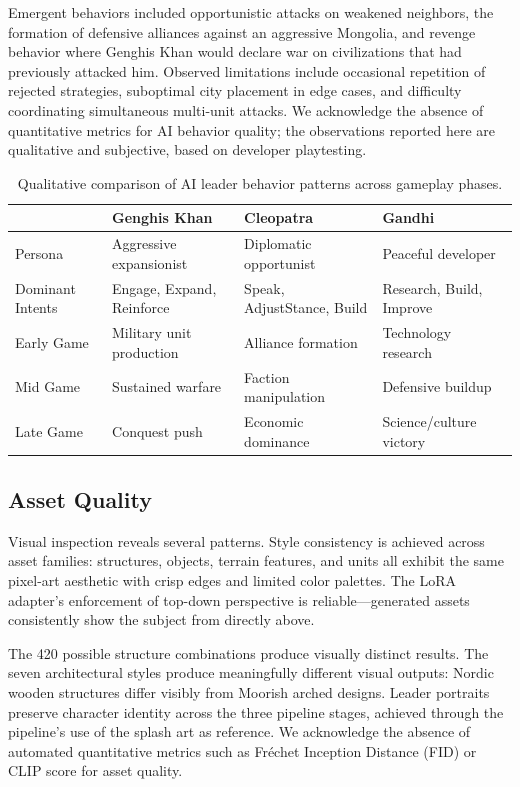\documentclass[conference]{IEEEtran}
\begin{document}
Emergent behaviors included opportunistic attacks on weakened neighbors,
the formation of defensive alliances against an aggressive Mongolia, and
revenge behavior where Genghis Khan would declare war on civilizations that
had previously attacked him. Observed limitations include occasional
repetition of rejected strategies, suboptimal city placement in edge cases,
and difficulty coordinating simultaneous multi-unit attacks. We acknowledge
the absence of quantitative metrics for AI behavior quality; the
observations reported here are qualitative and subjective, based on
developer playtesting.
\begin{table}[htb]
\centering
\caption{Qualitative comparison of AI leader behavior patterns across gameplay phases.}
\label{tab:ai-behavior}
\begin{tabular}{p{}p{}p{}p{}}
\toprule
& \textbf{Genghis Khan} & \textbf{Cleopatra} & \textbf{Gandhi} \\
\midrule
Persona & Aggressive expansionist & Diplomatic opportunist & Peaceful developer \\
Dominant Intents & Engage, Expand, Reinforce & Speak, AdjustStance, Build & Research, Build, Improve \\
Early Game & Military unit production & Alliance formation & Technology research \\
Mid Game & Sustained warfare & Faction manipulation & Defensive buildup \\
Late Game & Conquest push & Economic dominance & Science/culture victory \\
\bottomrule
\end{tabular}
\end{table}

\subsection{Asset Quality}

Visual inspection reveals several patterns. Style consistency is achieved
across asset families: structures, objects, terrain features, and units all
exhibit the same pixel-art aesthetic with crisp edges and limited color
palettes. The LoRA adapter's enforcement of top-down perspective is
reliable---generated assets consistently show the subject from directly
above.

The 420 possible structure combinations produce visually distinct results.
The seven architectural styles produce meaningfully different visual
outputs: Nordic wooden structures differ visibly from Moorish arched
designs. Leader portraits preserve character identity across the three
pipeline stages, achieved through the pipeline's use of the splash
art as reference. We acknowledge the absence of automated quantitative
metrics such as Fr\'{e}chet Inception Distance (FID) or CLIP score for
asset quality.
\end{document}
